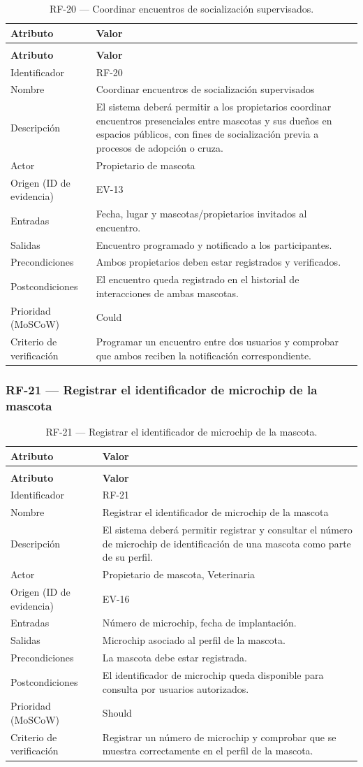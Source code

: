 \documentclass[journal,onecolumn]{IEEEtran}
\makeatletter
\newenvironment{atributos}[2]{%
	\small
	\begin{longtable}{@{}>{\raggedright\arraybackslash}p{4.2cm} >{\raggedright\arraybackslash}p{11.2cm}@{}}
		\caption{#2}\label{tab:#1}\\
		\toprule
		\textbf{Atributo} & \textbf{Valor} \\
		\midrule
		\endfirsthead
		\multicolumn{2}{@{}l}{\small\itshape (continuación)}\\
		\toprule
		\textbf{Atributo} & \textbf{Valor} \\
		\midrule
		\endhead
		\bottomrule
		\endlastfoot
	}{%
	\end{longtable}
	\normalsize
}
\makeatother
\begin{document}
	\begin{atributos}{RF-20}{RF-20 --- Coordinar encuentros de socialización supervisados.}
		Identificador & RF-20 \\
		Nombre & Coordinar encuentros de socialización supervisados \\
		Descripción & El sistema deberá permitir a los propietarios coordinar encuentros presenciales entre mascotas y sus dueños en espacios públicos, con fines de socialización previa a procesos de adopción o cruza. \\
		Actor & Propietario de mascota \\
		Origen (ID de evidencia) & EV-13 \\
		Entradas & Fecha, lugar y mascotas/propietarios invitados al encuentro. \\
		Salidas & Encuentro programado y notificado a los participantes. \\
		Precondiciones & Ambos propietarios deben estar registrados y verificados. \\
		Postcondiciones & El encuentro queda registrado en el historial de interacciones de ambas mascotas. \\
		Prioridad (MoSCoW) & Could \\
		Criterio de verificación & Programar un encuentro entre dos usuarios y comprobar que ambos reciben la notificación correspondiente. \\
	\end{atributos}
	
	\subsubsection{RF-21 --- Registrar el identificador de microchip de la mascota}
	
	\begin{atributos}{RF-21}{RF-21 --- Registrar el identificador de microchip de la mascota.}
		Identificador & RF-21 \\
		Nombre & Registrar el identificador de microchip de la mascota \\
		Descripción & El sistema deberá permitir registrar y consultar el número de microchip de identificación de una mascota como parte de su perfil. \\
		Actor & Propietario de mascota, Veterinaria \\
		Origen (ID de evidencia) & EV-16 \\
		Entradas & Número de microchip, fecha de implantación. \\
		Salidas & Microchip asociado al perfil de la mascota. \\
		Precondiciones & La mascota debe estar registrada. \\
		Postcondiciones & El identificador de microchip queda disponible para consulta por usuarios autorizados. \\
		Prioridad (MoSCoW) & Should \\
		Criterio de verificación & Registrar un número de microchip y comprobar que se muestra correctamente en el perfil de la mascota. \\
	\end{atributos}
	
\end{document}
